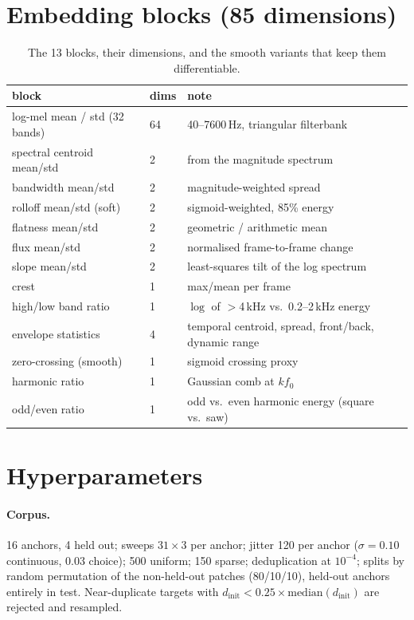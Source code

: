 \documentclass[11pt]{article}
\begin{document}
\section{Embedding blocks (85 dimensions)}\label{app:features}

\begin{table}[h]
\centering\small
\caption{The 13 blocks, their dimensions, and the smooth variants that keep them
differentiable.}
\begin{tabular}{lll}
\toprule
block & dims & note \\
\midrule
log-mel mean / std (32 bands) & 64 & 40--7600\,Hz, triangular filterbank \\
spectral centroid mean/std & 2 & from the magnitude spectrum \\
bandwidth mean/std & 2 & magnitude-weighted spread \\
rolloff mean/std (soft) & 2 & sigmoid-weighted, 85\% energy \\
flatness mean/std & 2 & geometric / arithmetic mean \\
flux mean/std & 2 & normalised frame-to-frame change \\
slope mean/std & 2 & least-squares tilt of the log spectrum \\
crest & 1 & max/mean per frame \\
high/low band ratio & 1 & $\log$ of $>$4\,kHz vs.\ 0.2--2\,kHz energy \\
envelope statistics & 4 & temporal centroid, spread, front/back, dynamic range \\
zero-crossing (smooth) & 1 & sigmoid crossing proxy \\
harmonic ratio & 1 & Gaussian comb at $k f_0$ \\
odd/even ratio & 1 & odd vs.\ even harmonic energy (square vs.\ saw) \\
\bottomrule
\end{tabular}
\end{table}

\section{Hyperparameters}\label{app:hyper}

\paragraph{Corpus.} 16 anchors, 4 held out; sweeps $31\times3$ per anchor;
jitter 120 per anchor ($\sigma = 0.10$ continuous, $0.03$ choice); 500 uniform;
150 sparse; deduplication at $10^{-4}$; splits by random permutation of the
non-held-out patches (80/10/10), held-out anchors entirely in test.
Near-duplicate targets with $d_{\text{init}} < 0.25 \times
\text{median}(d_{\text{init}})$ are rejected and resampled.
\end{document}

